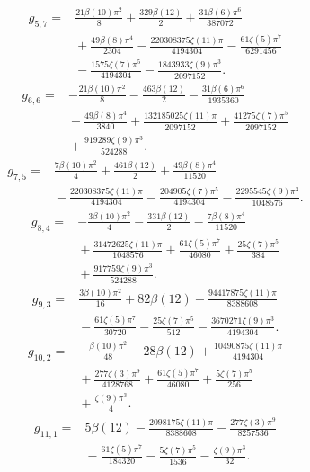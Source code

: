 \begin{align*}g_{5,7}={}&\frac{21 \beta(10) \pi^{2}}{8}+\frac{329 \beta(12)}{2}+\frac{31 \beta(6) \pi^{6}}{387072}\\
&{}+\frac{49 \beta(8) \pi^{4}}{2304}- \frac{220308375 \zeta(11) \pi}{4194304}- \frac{61 \zeta(5) \pi^{7}}{6291456}\\
&{}- \frac{1575 \zeta(7) \pi^{5}}{4194304}- \frac{1843933 \zeta(9) \pi^{3}}{2097152}.\end{align*}
\begin{align*}g_{6,6}={}&- \frac{21 \beta(10) \pi^{2}}{8}- \frac{463 \beta(12)}{2}- \frac{31 \beta(6) \pi^{6}}{1935360}\\
&{}- \frac{49 \beta(8) \pi^{4}}{3840}+\frac{132185025 \zeta(11) \pi}{2097152}+\frac{41275 \zeta(7) \pi^{5}}{2097152}\\
&{}+\frac{919289 \zeta(9) \pi^{3}}{524288}.\end{align*}
\begin{align*}g_{7,5}={}&\frac{7 \beta(10) \pi^{2}}{4}+\frac{461 \beta(12)}{2}+\frac{49 \beta(8) \pi^{4}}{11520}\\
&{}- \frac{220308375 \zeta(11) \pi}{4194304}- \frac{204905 \zeta(7) \pi^{5}}{4194304}- \frac{2295545 \zeta(9) \pi^{3}}{1048576}.\end{align*}
\begin{align*}g_{8,4}={}&- \frac{3 \beta(10) \pi^{2}}{4}- \frac{331 \beta(12)}{2}- \frac{7 \beta(8) \pi^{4}}{11520}\\
&{}+\frac{31472625 \zeta(11) \pi}{1048576}+\frac{61 \zeta(5) \pi^{7}}{46080}+\frac{25 \zeta(7) \pi^{5}}{384}\\
&{}+\frac{917759 \zeta(9) \pi^{3}}{524288}.\end{align*}
\begin{align*}g_{9,3}={}&\frac{3 \beta(10) \pi^{2}}{16}+82 \beta(12)- \frac{94417875 \zeta(11) \pi}{8388608}\\
&{}- \frac{61 \zeta(5) \pi^{7}}{30720}- \frac{25 \zeta(7) \pi^{5}}{512}- \frac{3670271 \zeta(9) \pi^{3}}{4194304}.\end{align*}
\begin{align*}g_{10,2}={}&- \frac{\beta(10) \pi^{2}}{48}- 28 \beta(12)+\frac{10490875 \zeta(11) \pi}{4194304}\\
&{}+\frac{277 \zeta(3) \pi^{9}}{4128768}+\frac{61 \zeta(5) \pi^{7}}{46080}+\frac{5 \zeta(7) \pi^{5}}{256}\\
&{}+\frac{\zeta(9) \pi^{3}}{4}.\end{align*}
\begin{align*}g_{11,1}={}&5 \beta(12)- \frac{2098175 \zeta(11) \pi}{8388608}- \frac{277 \zeta(3) \pi^{9}}{8257536}\\
&{}- \frac{61 \zeta(5) \pi^{7}}{184320}- \frac{5 \zeta(7) \pi^{5}}{1536}- \frac{\zeta(9) \pi^{3}}{32}.\end{align*}

